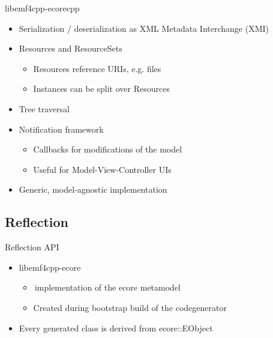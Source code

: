 \documentclass[pdf, 10pt]{beamer}
\begin{document}
\begin{frame}{libemf4cpp-ecorecpp}
  \begin{itemize}
  \item Serialization / deserialization as XML Metadata Interchange (XMI)
  \item Resources and ResourceSets
    \begin{itemize}
    \item Resources reference URIs, e.g. files
    \item Instances can be split over Resources
    \end{itemize}
  \item Tree traversal
  \item Notification framework
    \begin{itemize}
    \item Callbacks for modifications of the model
    \item Useful for Model-View-Controller UIs
    \end{itemize}
  \item<2-> Generic, model-agnostic implementation
  \end{itemize}
\end{frame}

\subsection{Reflection}

\begin{frame}{Reflection API}
  \begin{itemize}
  \item libemf4cpp-ecore
    \begin{itemize}
    \item \CC\,implementation of the ecore metamodel
    \item Created during bootstrap build of the codegenerator
    \end{itemize}
  \item Every generated class is derived from ecore::EObject
  \end{itemize}
\end{frame}
\end{document}
